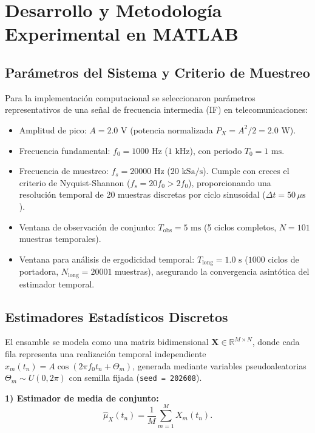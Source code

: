 \documentclass[conference]{IEEEtran}
\begin{document}
\section{Desarrollo y Metodología Experimental en MATLAB}

\subsection{Parámetros del Sistema y Criterio de Muestreo}
Para la implementación computacional se seleccionaron parámetros representativos de una señal de frecuencia intermedia (IF) en telecomunicaciones:
\begin{itemize}
    \item Amplitud de pico: $A = 2.0\text{ V}$ (potencia normalizada $P_X = A^2/2 = 2.0\text{ W}$).
    \item Frecuencia fundamental: $f_0 = 1000\text{ Hz}$ ($1\text{ kHz}$), con periodo $T_0 = 1\text{ ms}$.
    \item Frecuencia de muestreo: $f_s = 20000\text{ Hz}$ ($20\text{ kSa/s}$). Cumple con creces el criterio de Nyquist-Shannon ($f_s = 20 f_0 > 2 f_0$), proporcionando una resolución temporal de 20 muestras discretas por ciclo sinusoidal ($\Delta t = 50\,\mu\text{s}$).
    \item Ventana de observación de conjunto: $T_{\text{obs}} = 5\text{ ms}$ (5 ciclos completos, $N = 101$ muestras temporales).
    \item Ventana para análisis de ergodicidad temporal: $T_{\text{long}} = 1.0\text{ s}$ ($1000$ ciclos de portadora, $N_{\text{long}} = 20001$ muestras), asegurando la convergencia asintótica del estimador temporal.
\end{itemize}

\subsection{Estimadores Estadísticos Discretos}
El ensamble se modela como una matriz bidimensional $\mathbf{X} \in \mathbb{R}^{M \times N}$, donde cada fila representa una realización temporal independiente $x_m(t_n) = A\cos(2\pi f_0 t_n + \Theta_m)$, generada mediante variables pseudoaleatorias $\Theta_m \sim U(0, 2\pi)$ con semilla fijada (\texttt{seed = 202608}).

\textbf{1) Estimador de media de conjunto:}
\begin{equation}
\hat{\mu}_X(t_n) = \frac{1}{M} \sum_{m=1}^{M} X_m(t_n).
\end{equation}
\end{document}
